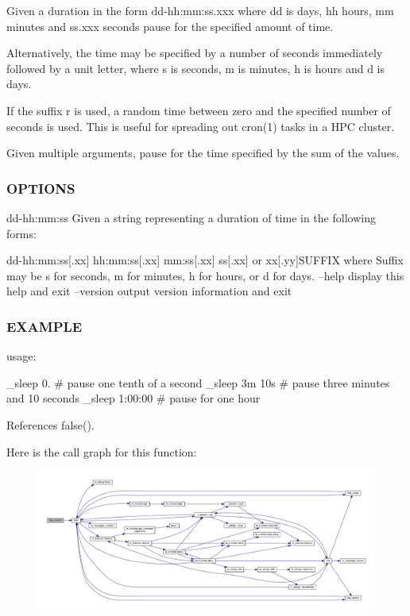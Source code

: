 Given a duration in the form dd-\/hh\+:mm\+:ss.\+xxx where dd is days, hh hours, mm minutes and ss.\+xxx seconds pause for the specified amount of time.

Alternatively, the time may be specified by a number of seconds immediately followed by a unit letter, where s is seconds, m is minutes, h is hours and d is days.

If the suffix r is used, a random time between zero and the specified number of seconds is used. This is useful for spreading out cron(1) tasks in a H\+PC cluster.

Given multiple arguments, pause for the time specified by the sum of the values. \subsubsection*{O\+P\+T\+I\+O\+NS}

dd-\/hh\+:mm\+:ss Given a string representing a duration of time in the following forms\+:

dd-\/hh\+:mm\+:ss\mbox{[}.xx\mbox{]} hh\+:mm\+:ss\mbox{[}.xx\mbox{]} mm\+:ss\mbox{[}.xx\mbox{]} ss\mbox{[}.xx\mbox{]} or xx\mbox{[}.yy\mbox{]}S\+U\+F\+F\+IX where Suffix may be s for seconds, m for minutes, h for hours, or d for days. --help display this help and exit --version output version information and exit \subsubsection*{E\+X\+A\+M\+P\+LE}

usage\+:

\+\_\+sleep 0. \# pause one tenth of a second \+\_\+sleep 3m 10s \# pause three minutes and 10 seconds \+\_\+sleep 1\+:00\+:00 \# pause for one hour 

References false().

Here is the call graph for this function\+:
\nopagebreak
\begin{figure}[H]
\begin{center}
\leavevmode
\includegraphics[width=350pt]{__sleep_8f90_a39c21619b08a3c22f19e2306efd7f766_cgraph}
\end{center}
\end{figure}
